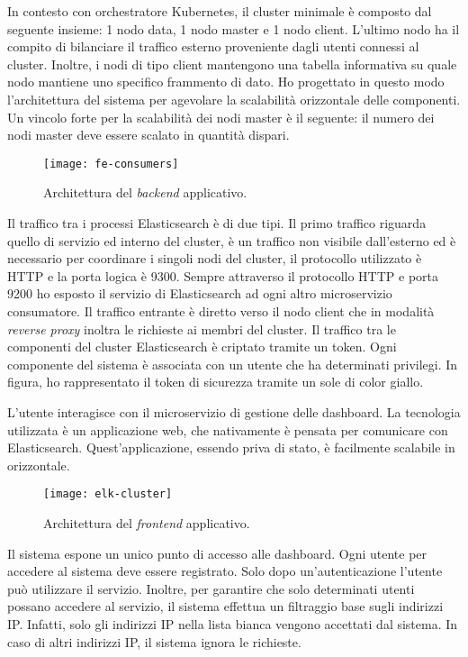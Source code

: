 In contesto con orchestratore Kubernetes, il cluster minimale è composto 
dal seguente insieme: 1 nodo data, 1 nodo master e 1 nodo client. 
L'ultimo nodo ha il compito di bilanciare il traffico esterno proveniente 
dagli utenti connessi al cluster. Inoltre, i nodi di tipo client mantengono 
una tabella informativa su quale nodo mantiene uno specifico 
frammento di dato. Ho progettato in questo modo l'architettura del sistema 
per agevolare la scalabilità orizzontale delle componenti. Un vincolo forte
per la scalabilità dei nodi master è il seguente: il numero dei nodi 
master deve essere scalato in quantità dispari.

\begin{figure}[htbp]
	\begin{center}
		\texttt{[image: fe-consumers]}
		\caption{Architettura del \textit{backend} applicativo.}
	\end{center}
\end{figure}

Il traffico tra i processi Elasticsearch è di due tipi. Il primo traffico 
riguarda quello di servizio ed interno del cluster, è un traffico non visibile 
dall'esterno ed è necessario per coordinare i singoli nodi del cluster, il protocollo 
utilizzato è HTTP e la porta logica è 9300. Sempre attraverso il protocollo HTTP e porta 9200
ho esposto il servizio di Elasticsearch ad ogni altro microservizio consumatore. 
Il traffico entrante è diretto verso il nodo client che in modalità \textit{reverse proxy}
inoltra le richieste ai membri del cluster. Il traffico tra le componenti del 
cluster Elasticsearch è criptato tramite un token. Ogni componente del sistema 
è associata con un utente che ha determinati privilegi. In figura, ho rappresentato 
il token di sicurezza tramite un sole di color giallo. 

L'utente interagisce con il microservizio di gestione delle dashboard.
La tecnologia utilizzata è un applicazione web, che nativamente è 
pensata per comunicare con Elasticsearch. Quest'applicazione, 
essendo priva di stato, è facilmente scalabile in orizzontale.

\begin{figure}[htbp]
	\begin{center}
		\texttt{[image: elk-cluster]}
		\caption{Architettura del \textit{frontend} applicativo.}
	\end{center}
\end{figure}

Il sistema espone un unico punto di accesso alle dashboard. 
Ogni utente per accedere al sistema deve essere registrato.
Solo dopo un'autenticazione l'utente può utilizzare il servizio.
Inoltre, per garantire che solo determinati utenti possano accedere al
servizio, il sistema effettua un filtraggio base sugli indirizzi IP.
Infatti, solo gli indirizzi IP nella lista bianca vengono accettati
dal sistema. In caso di altri indirizzi IP, il sistema ignora le richieste.  


